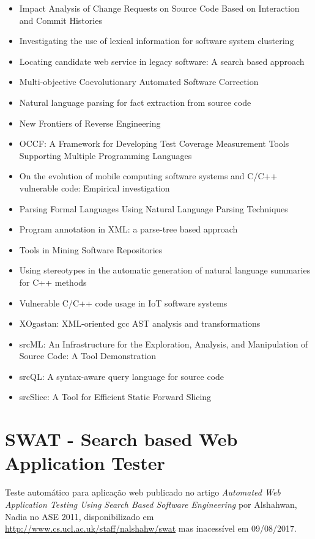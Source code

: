 \begin{itemize}
\item Impact Analysis of Change Requests on Source Code Based on Interaction and Commit Histories
\item Investigating the use of lexical information for software system clustering
\item Locating candidate web service in legacy software: A search based approach
\item Multi-objective Coevolutionary Automated Software Correction
\item Natural language parsing for fact extraction from source code
\item New Frontiers of Reverse Engineering
\item OCCF: A Framework for Developing Test Coverage Measurement Tools Supporting Multiple Programming Languages
\item On the evolution of mobile computing software systems and C/C++ vulnerable code: Empirical investigation
\item Parsing Formal Languages Using Natural Language Parsing Techniques
\item Program annotation in XML: a parse-tree based approach
\item Tools in Mining Software Repositories
\item Using stereotypes in the automatic generation of natural language summaries for C++ methods
\item Vulnerable C/C++ code usage in IoT software systems
\item XOgastan: XML-oriented gcc AST analysis and transformations
\item srcML: An Infrastructure for the Exploration, Analysis, and Manipulation of Source Code: A Tool Demonstration
\item srcQL: A syntax-aware query language for source code
\item srcSlice: A Tool for Efficient Static Forward Slicing
\end{itemize}

\section{SWAT - Search based Web Application Tester}

Teste automático para aplicação web
publicado no artigo {\it Automated Web Application Testing Using Search Based Software Engineering}
por Alshahwan, Nadia
no ASE 2011,
disponibilizado em \url{http://www.cs.ucl.ac.uk/staff/nalshahw/swat}
mas inacessível em 09/08/2017.

